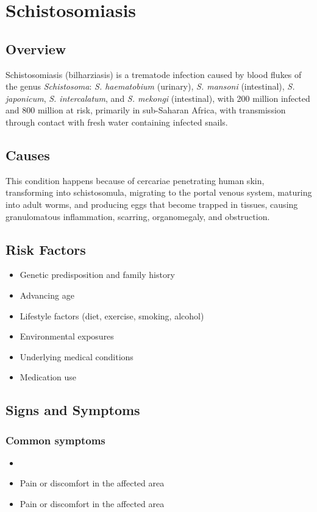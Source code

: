 \chapter{Schistosomiasis}
\label{sec:Schistosomiasis}

\section{Overview}
Schistosomiasis (bilharziasis) is a trematode infection caused by blood flukes of the genus \textit{Schistosoma}: \textit{S. haematobium} (urinary), \textit{S. mansoni} (intestinal), \textit{S. japonicum}, \textit{S. intercalatum}, and \textit{S. mekongi} (intestinal), with 200 million infected and 800 million at risk, primarily in sub-Saharan Africa, with transmission through contact with fresh water containing infected snails.
\section{Causes}
This condition happens because of cercariae penetrating human skin, transforming into schistosomula, migrating to the portal venous system, maturing into adult worms, and producing eggs that become trapped in tissues, causing granulomatous inflammation, scarring, organomegaly, and obstruction.     
\section{Risk Factors}

\begin{itemize}[noitemsep]
  \item Genetic predisposition and family history
  \item Advancing age
  \item Lifestyle factors (diet, exercise, smoking, alcohol)
  \item Environmental exposures
  \item Underlying medical conditions
  \item Medication use
\end{itemize}
\section{Signs and Symptoms}

\subsection{Common symptoms}
\begin{itemize}[noitemsep]
  \item \item Pain or discomfort in the affected area    \item Pain or discomfort in the affected area
  \end{itemize}

